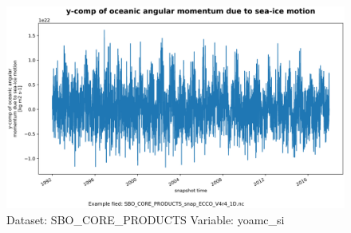 \begin{figure}[H]
\centering
\includegraphics[width=\textwidth]{../images/plots/oneD_plots/SBO_Core_Products/yoamc_si.png}
\caption{Dataset: SBO\_CORE\_PRODUCTS Variable: yoamc\_si}
\label{tab:table-SBO_CORE_PRODUCTS_yoamc_si-Plot}
\end{figure}
\pagebreak
